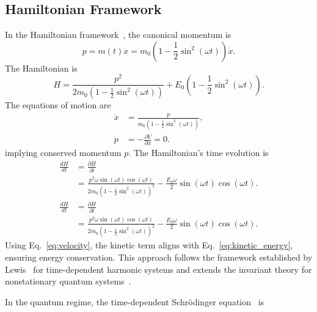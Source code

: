 \documentclass[%
 reprint,
 amsmath,amssymb,
 aps,
]{revtex4-1}
\numberwithin{equation}{section}%
\begin{document}
\subsection{Hamiltonian Framework}

In the Hamiltonian framework~\cite{goldstein2002}, the canonical momentum is
\begin{equation}
p = m(t) \dot{x} = m_0 \left( 1 - \frac{1}{2} \sin^2 (\omega t) \right) \dot{x}.
\end{equation}
The Hamiltonian is
\begin{equation}
H = \frac{p^2}{2 m_0 \left( 1 - \frac{1}{2} \sin^2 (\omega t) \right)} + E_0 \left( 1 - \frac{1}{2} \sin^2 (\omega t) \right).
\label{eq:hamiltonian}
\end{equation}
The equations of motion are
\begin{equation}
\begin{split}
\dot{x} &= \frac{p}{m_0 \left( 1 - \frac{1}{2} \sin^2 (\omega t) \right)}, \\
\dot{p} &= -\frac{\partial V}{\partial x} = 0.
\end{split}
\end{equation}
implying conserved momentum \( p \). The Hamiltonian's time evolution is
\begin{equation}
\begin{split}
\frac{dH}{dt} &= \frac{\partial H}{\partial t} \\
&=  \frac{p^2 \omega \sin (\omega t) \cos (\omega t)}{2 m_0 \left( 1 - \frac{1}{2} \sin^2 (\omega t) \right)^2} - \frac{E_0 \omega}{2} \sin (\omega t) \cos (\omega t).
\end{split}
\end{equation}
\begin{equation}
\begin{split}
\frac{dH}{dt} &= \frac{\partial H}{\partial t} \\
&= \frac{p^2 \omega \sin (\omega t) \cos (\omega t)}{2 m_0 \left( 1 - \frac{1}{2} \sin^2 (\omega t) \right)^2} - \frac{E_0 \omega}{2} \sin (\omega t) \cos (\omega t).
\end{split}
\end{equation}
Using Eq.~\eqref{eq:velocity}, the kinetic term aligns with Eq.~\eqref{eq:kinetic_energy}, ensuring energy conservation. This approach follows the framework established by Lewis~\cite{lewis1969} for time-dependent harmonic systems and extends the invariant theory for nonstationary quantum systems~\cite{dodonov2000}.

In the quantum regime, the time-dependent Schrödinger equation~\cite{messiah1966} is
\end{document}
